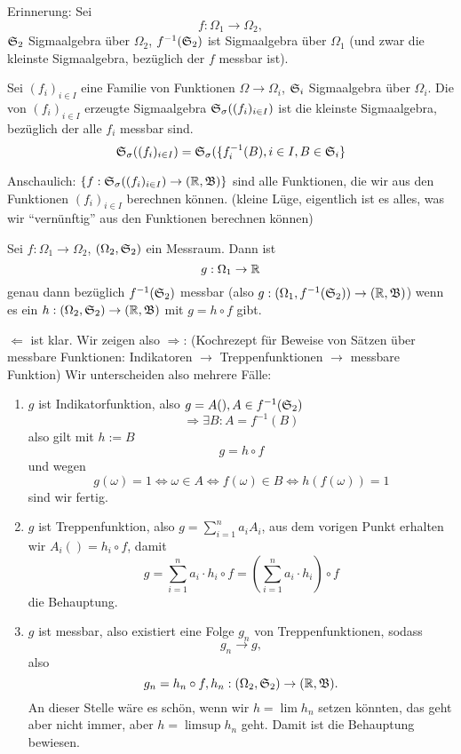 			Erinnerung:
				Sei 
				\[ f: \Omega_1\to \Omega_2, \]
				$\mathfrak{S}_2$ Sigmaalgebra über $\Omega_2$, $f^{-1}(\mathfrak{S}_2)$ ist Sigmaalgebra über $\Omega_1$ (und zwar die kleinste Sigmaalgebra, bezüglich der $f$ messbar ist).
			
			\begin{defi}
				Sei $(f_i)_{i\in I}$ eine Familie von Funktionen $\Omega\to\Omega_i$, $\mathfrak{S}_i$ Sigmaalgebra über $\Omega_i$. Die von $(f_i)_{i\in I}$ erzeugte Sigmaalgebra $\mathfrak{S}_\sigma((f_i)_{i\in I})$ ist die kleinste Sigmaalgebra, bezüglich der alle $f_i$ messbar sind.
				\[ \mathfrak{S}_\sigma((f_i)_{i\in I})=\mathfrak{S}_\sigma(\{f_i^{-1}(B), i\in I, B\in\mathfrak{S}_i\} \]
			\end{defi}
			
			\begin{bem}
				Anschaulich: $\{f: \mathfrak{S}_\sigma((f_i)_{i\in I})\to (\mathbb{R},\mathfrak{B})\}$ sind alle Funktionen, die wir aus den Funktionen $(f_i)_{i\in I}$ berechnen können. (kleine Lüge, eigentlich ist es alles, was wir "`vernünftig"' aus den Funktionen berechnen können)
			\end{bem}
			
			\begin{satz}
				Sei $f:\Omega_1\to\Omega_2$, $(\Omega_2,\mathfrak{S}_2)$ ein Messraum. Dann ist
				\[ g:\Omega_1\to \mathbb{R} \]
				genau dann bezüglich $f^{-1}(\mathfrak{S}_2)$ messbar (also $g:(\Omega_1,f^{-1}(\mathfrak{S}_2))\to(\mathbb{R},\mathfrak{B})$) wenn es ein $h:(\Omega_2,\mathfrak{S}_2)\to(\mathbb{R}, \mathfrak{B})$ mit $g=h\circ f$ gibt. 
			\end{satz}
			
			\begin{bew}
				$\Leftarrow$ ist klar.\newline
				Wir zeigen also $\Rightarrow$: (Kochrezept für Beweise von Sätzen über messbare Funktionen: Indikatoren $\rightarrow$ Treppenfunktionen $\rightarrow$ messbare Funktion)\newline
				Wir unterscheiden also mehrere Fälle:
				\begin{enumerate}[(1)]
					\item $g$ ist Indikatorfunktion, also $g=A(), A\in f^{-1}(\mathfrak{S}_2)$
					\[ \Rightarrow \exists B: A=f^{-1}(B) \]
					also gilt mit $h:=B$
					\[ g=h\circ f \]
					und wegen
					\[ g(\omega)=1\Leftrightarrow \omega\in A\Leftrightarrow f(\omega)\in B\Leftrightarrow h(f(\omega))=1 \]
					sind wir fertig.
					\item $g$ ist Treppenfunktion, also $g=\sum_{i=1}^n a_i A_i$, aus dem vorigen Punkt erhalten wir $A_i()=h_i\circ f$, damit
					\[ g=\sum_{i=1}^{n}a_i\cdot h_i\circ f=\left(\sum_{i=1}^{n}a_i\cdot h_i\right)\circ f \]
					die Behauptung.
					\item $g$ ist messbar, also existiert eine Folge $g_n$ von Treppenfunktionen, sodass
					\[ g_n\to g, \]
					also 
					\[ g_n=h_n\circ f, h_n:(\Omega_2, \mathfrak{S}_2)\to(\mathbb{R},\mathfrak{B}). \]
					An dieser Stelle wäre es schön, wenn wir $h=\lim h_n$ setzen könnten, das geht aber nicht immer, aber $h=\limsup h_n$ geht. Damit ist die Behauptung bewiesen. 
				\end{enumerate}
			\end{bew}
			
